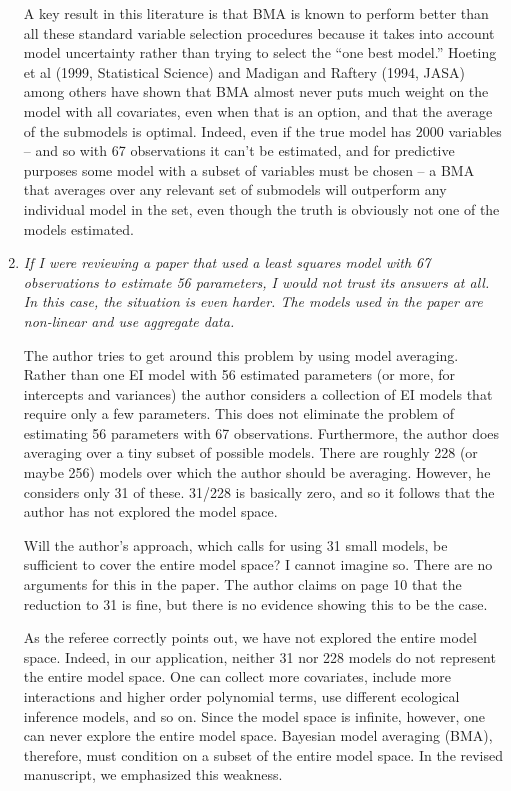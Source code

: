 \documentclass[11pt]{article}
\begin{document}
\begin{enumerate}
  A key result in this literature is that BMA is known to perform
  better than all these standard variable selection procedures because
  it takes into account model uncertainty rather than trying to select
  the ``one best model.''  Hoeting et al (1999, Statistical Science)
  and Madigan and Raftery (1994, JASA) among others have shown that
  BMA almost never puts much weight on the model with all covariates,
  even when that is an option, and that the average of the submodels
  is optimal.  Indeed, even if the true model has 2000 variables --
  and so with 67 observations it can't be estimated, and for
  predictive purposes some model with a subset of variables must be
  chosen -- a BMA that averages over any relevant set of submodels
  will outperform any individual model in the set, even though the
  truth is obviously not one of the models estimated.  
 
\item {\it If I were reviewing a paper that used a least squares model
    with 67 observations to estimate 56 parameters, I would not trust
    its answers at all.  In this case, the situation is even harder.
    The models used in the paper are non-linear and use aggregate
    data.
    
    The author tries to get around this problem by using model
    averaging.  Rather than one EI model with 56 estimated parameters
    (or more, for intercepts and variances) the author considers a
    collection of EI models that require only a few parameters.  This
    does not eliminate the problem of estimating 56 parameters with 67
    observations.  Furthermore, the author does averaging over a tiny
    subset of possible models.  There are roughly 228 (or maybe 256)
    models over which the author should be averaging.  However, he
    considers only 31 of these.  31/228 is basically zero, and so it
    follows that the author has not explored the model space. 
    
    Will the author's approach, which calls for using 31 small models,
    be sufficient to cover the entire model space?  I cannot imagine
    so.  There are no arguments for this in the paper.  The author
    claims on page 10 that the reduction to 31 is fine, but there is
    no evidence showing this to be the case.}
  
  As the referee correctly points out, we have not explored the entire
  model space. Indeed, in our application, neither 31 nor 228 models
  do not represent the entire model space. One can collect more
  covariates, include more interactions and higher order polynomial
  terms, use different ecological inference models, and so on.  Since
  the model space is infinite, however, one can never explore the
  entire model space.  Bayesian model averaging (BMA), therefore, must
  condition on a subset of the entire model space. In the revised
  manuscript, we emphasized this weakness.
  

\end{enumerate}
\end{document}
